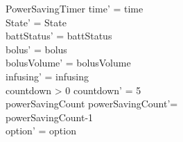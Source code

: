 \begin{schema}{PowerSavingTimer}
	time' = time\\ State' = State\\
	battStatus' = battStatus\\
	bolus' = bolus\\
	bolusVolume' = bolusVolume\\
	infusing' = infusing\\
	countdown > 0 \land countdown' = 5\\
	\pagebreak
	powerSavingCount  \land powerSavingCount'=\\
	powerSavingCount-1\\
	option' = option\\
\end{schema}

